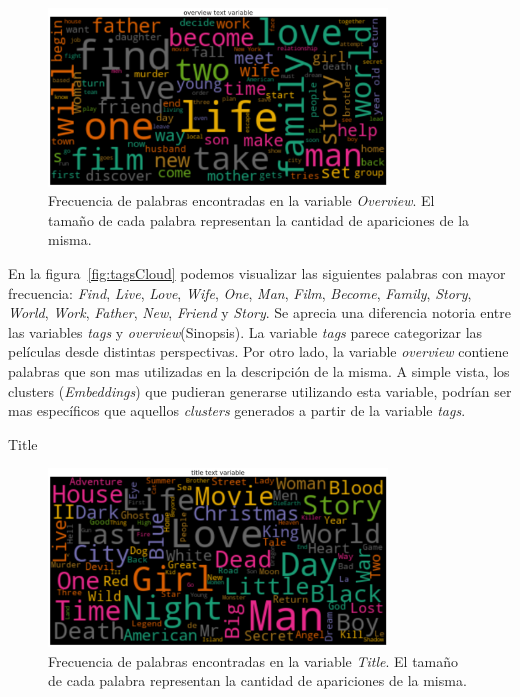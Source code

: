 \documentclass[11pt,a4paper,twoside]{thesis}
\begin{document}
\begin{figure}[h!]
	\centering
	\includegraphics[width=9cm]{./images/Cloud-Overview.png}
	\caption{
		Frecuencia de palabras encontradas en la variable
		\textit{Overview}. El tamaño de cada palabra representan
		la cantidad de apariciones de la misma.
	}
	\label{fig:overviewCloud}
\end{figure}

En la figura~\ref{fig:tagsCloud} podemos visualizar las siguientes palabras con
mayor frecuencia: \textit{Find}, \textit{Live}, \textit{Love}, \textit{Wife},
\textit{One}, \textit{Man}, \textit{Film}, \textit{Become}, \textit{Family},
\textit{Story}, \textit{World}, \textit{Work}, \textit{Father}, \textit{New},
\textit{Friend} y \textit{Story}. Se aprecia una diferencia notoria entre las
variables \textit{tags} y \textit{overview}(Sinopsis). La variable
\textit{tags} parece categorizar las películas desde distintas perspectivas.
Por otro lado, la variable \textit{overview} contiene palabras que son mas
utilizadas en la descripción de la misma. A simple vista, los clusters
(\textit{Embeddings}) que pudieran generarse utilizando esta variable, podrían
ser mas específicos que aquellos \textit{clusters} generados a partir de la
variable \textit{tags}.

\begin{description}
	\item[Title]
\end{description}

\begin{figure}[h!]
	\centering
	\includegraphics[width=9cm]{./images/Cloud-Title.png}
	\caption{Frecuencia de palabras encontradas en la variable
		\textit{Title}. El tamaño de cada palabra representan la
		cantidad de apariciones de la misma.}
	\label{fig:titleCloud}
\end{figure}
\end{document}
